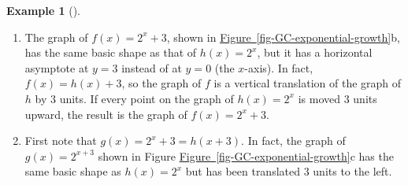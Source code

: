 \documentclass[10pt,]{book}
\theoremstyle{plain}
\theoremstyle{definition}
\theoremstyle{definition}
\theoremstyle{definition}
\newtheorem{example}[theorem]{Example}
\theoremstyle{definition}
\theoremstyle{definition}
\numberwithin{equation}{section}
\begin{document}
\begin{example}[]
\leavevmode%
\begin{enumerate}[label=*\alph**]
\item\hypertarget{li-665}{}
		The graph of \(f(x) = 2^x + 3\), shown in \hyperref[fig-GC-exponential-growth]{Figure~\ref{fig-GC-exponential-growth}}b, has the same basic shape as that of \(h(x) = 2^x\), but it has a horizontal asymptote at \(y = 3\) instead of at \(y = 0\) (the \(x\)-axis). In fact, \(f(x) = h(x) + 3\), so the graph of \(f\) is a vertical translation of the graph of \(h\) by \(3\) units. If every point on the graph of \(h(x) = 2^x\) is moved \(3\) units upward, the result is the graph of \(f (x) = 2^x + 3\).
	\item\hypertarget{li-666}{}
		First note that \(g(x) = 2^x+3 = h(x + 3)\). In fact, the graph of \(g(x) = 2^{x+3}\) shown in Figure \hyperref[fig-GC-exponential-growth]{Figure~\ref{fig-GC-exponential-growth}}c has the same basic shape as \(h(x) = 2^x\) but has been translated \(3\) units to the left.
	\end{enumerate}

%
\end{example}
\par
\end{document}

